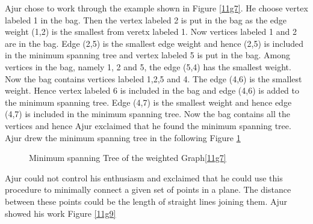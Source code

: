 Ajur chose to work through the example shown in Figure \ref{11g7}. He choose vertex labeled 1 in the bag. Then the vertex labeled 2 is put in the bag as the edge weight (1,2) is the smallest from veretx labeled 1. Now vertices labeled 1 and 2 are in the bag. Edge (2,5) is the smallest edge weight and hence (2,5) is included in the minimum spanning tree and vertex labeled 5 is put in the bag. Among vertices in the bag, namely 1, 2 and 5, the edge (5,4) has the smallest weight. Now the bag contains vertices labeled 1,2,5 and 4. The edge (4,6) is the smallest weight. Hence vertex labeled 6 is included in the bag and edge (4,6) is added to the minimum spanning tree. Edge (4,7) is the smallest weight and hence edge (4,7) is  included in the minimum spanning tree. Now the bag contains all the vertices and hence Ajur exclaimed that he found the minimum spanning tree.
Ajur drew the minimum spanning tree in the following Figure \ref{11g8}

\begin{figure}
\begin{center}
\caption{ Minimum spanning Tree of the weighted Graph\ref{11g7}}\label{11g8}
\end{center}
\end{figure}

Ajur could not control his enthusiasm and exclaimed that he could use this procedure to minimally connect a given set of points in a plane. The distance between these points could be the length of straight lines joining them. Ajur showed his work Figure \ref{11g9}

